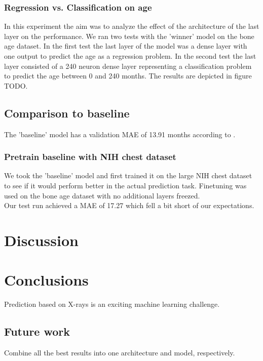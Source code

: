 \documentclass[10pt,twocolumn,letterpaper]{article}
\begin{document}
\subsubsection{Regression vs. Classification on age}
In this experiment the aim was to analyze the effect of the architecture of the last layer on the performance. We ran two tests with the 'winner' model on the bone age dataset. In the first test the last layer of the model was a dense layer with one output to predict the age as a regression problem. In the second test the last layer consisted of a 240 neuron dense layer representing a classification problem to predict the age between 0 and 240 months.
The results are depicted in figure TODO.

\subsection{Comparison to baseline}
The 'baseline' model has a validation MAE of 13.91 months according to \cite{kaggleboneage}.

\subsubsection{Pretrain baseline \cite{kaggleboneage} with NIH chest dataset}
We took the 'baseline' model and first trained it on the large NIH chest dataset to see if it would perform better in the actual prediction task. Finetuning was used on the bone age dataset with no additional layers freezed. \\
Our test run achieved a MAE of 17.27 which fell a bit short of our expectations.


\section{Discussion}


\section{Conclusions}
Prediction based on X-rays is an exciting machine learning challenge.

\subsection{Future work}
Combine all the best results into one architecture and model, respectively.

\printbibliography
\end{document}
